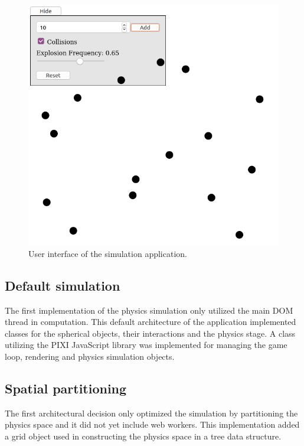 \documentclass[conference]{IEEEtran}
\begin{document}
\begin{figure}[ht]
	\centering
	\includegraphics[scale=0.5]{figs/figure2.png}
	\caption{User interface of the simulation application.}
	\label{fig:figure2}
\end{figure}

\subsection{Default simulation} 
\label{sec:default}

The first implementation of the physics simulation only utilized the main DOM thread in computation. This default architecture of the application implemented classes for the
spherical objects, their interactions and the physics stage. A class utilizing the PIXI JavaScript library was implemented for managing the game loop, rendering and
physics simulation objects.

\subsection{Spatial partitioning} 
\label{sec:spatial}

The first architectural decision only optimized the simulation by partitioning the physics space and it did not yet include web workers. This implementation added a grid object used in constructing the physics space in a tree data structure.
\end{document}
